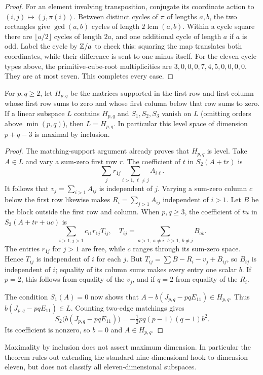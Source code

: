 \begin{proof}
For an element involving transposition, conjugate its coordinate action to $(i,j)\mapsto(j,\pi(i))$. Between distinct cycles of $\pi$ of lengths $a,b$, the two rectangles give $\gcd(a,b)$ cycles of length $2\operatorname{lcm}(a,b)$. Within a cycle square there are $\lfloor a/2\rfloor$ cycles of length $2a$, and one additional cycle of length $a$ if $a$ is odd. Label the cycle by $\mathbb Z/a$ to check this: squaring the map translates both coordinates, while their difference is sent to one minus itself. For the eleven cycle types above, the primitive-cube-root multiplicities are
$3,0,0,0,7,4,5,0,0,0,0$. They are at most seven. This completes every case.
\end{proof}

\begin{theorem}\label{thm:hook}
For $p,q\geq2$, let $H_{p,q}$ be the matrices supported in the first row and first column whose first row sums to zero and whose first column below that row sums to zero. If a linear subspace $L$ contains $H_{p,q}$ and $S_1,S_2,S_3$ vanish on $L$ (omitting orders above $\min(p,q)$), then $L=H_{p,q}$. In particular this level space of dimension $p+q-3$ is maximal by inclusion.
\end{theorem}
\begin{proof}
The matching-support argument already proves that $H_{p,q}$ is level. Take $A\in L$ and vary a sum-zero first row $r$. The coefficient of $t$ in $S_2(A+tr)$ is
\[
 \sum_jr_{1j}\sum_{i>1,\ell\ne j}A_{i\ell}.
\]
It follows that $v_j=\sum_{i>1}A_{ij}$ is independent of $j$. Varying a sum-zero column $c$ below the first row likewise makes $R_i=\sum_{j>1}A_{ij}$ independent of $i>1$.
Let $B$ be the block outside the first row and column. When $p,q\geq3$, the coefficient of $tu$ in $S_3(A+tr+uc)$ is
\[
 \sum_{i>1,j>1}c_{i1}r_{1j}T_{ij},
 \quad T_{ij}=\sum_{a>1,\ a\ne i,\ b>1,\ b\ne j}B_{ab}.
\]
The entries $r_{1j}$ for $j>1$ are free, while $c$ ranges through its sum-zero space. Hence $T_{ij}$ is independent of $i$ for each $j$. But
$T_{ij}=\sum B-R_i-v_j+B_{ij}$, so $B_{ij}$ is independent of $i$; equality of its column sums makes every entry one scalar $b$. If $p=2$, this follows from equality of the $v_j$, and if $q=2$ from equality of the $R_i$.

The condition $S_1(A)=0$ now shows that
$A-b(J_{p,q}-pqE_{11})\in H_{p,q}$. Thus $b(J_{p,q}-pqE_{11})\in L$. Counting two-edge matchings gives
\[
 S_2\bigl(b(J_{p,q}-pqE_{11})\bigr)
 =-\tfrac12pq(p-1)(q-1)b^2.
\]
Its coefficient is nonzero, so $b=0$ and $A\in H_{p,q}$.
\end{proof}

Maximality by inclusion does not assert maximum dimension. In particular the theorem rules out extending the standard nine-dimensional hook to dimension eleven, but does not classify all eleven-dimensional subspaces.

